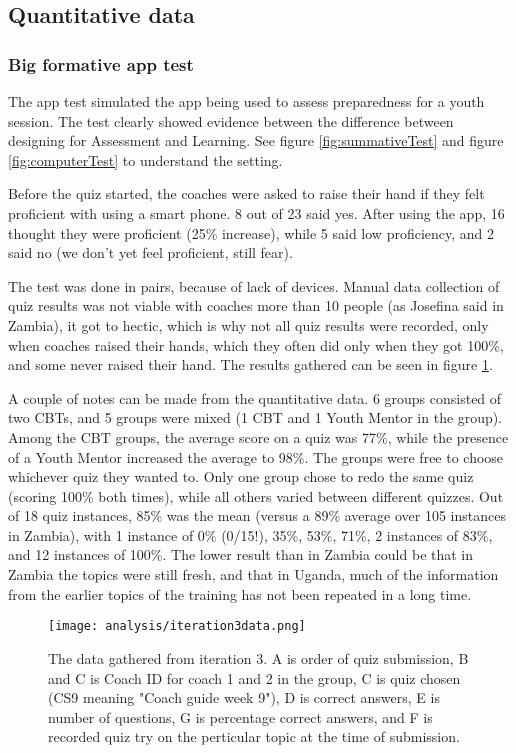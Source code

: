 \subsection{Quantitative data}


    \subsubsection{Big formative app test}
  The app test simulated the app being used to assess preparedness for a youth session. The test clearly showed evidence between the difference between designing for Assessment and Learning. See figure \ref{fig:summativeTest} and figure \ref{fig:computerTest} to understand the setting.

  Before the quiz started, the coaches were asked to raise their hand if they felt proficient with using a smart phone. 8 out of 23 said yes. After using the app, 16 thought they were proficient (25\% increase), while 5 said low proficiency, and 2 said no (we don't yet feel proficient, still fear).

  The test was done in pairs, because of lack of devices. Manual data collection of quiz results was not viable with coaches more than 10 people (as Josefina said in Zambia), it got to hectic, which is why not all quiz results were recorded, only when coaches raised their hands, which they often did only when they got 100\%, and some never raised their hand. The results gathered can be seen in figure \ref{fig:iteration3data}.

  A couple of notes can be made from the quantitative data. 6 groups consisted of two CBTs, and 5 groups were mixed (1 CBT and 1 Youth Mentor in the group). Among the CBT groups, the average score on a quiz was 77\%, while the presence of a Youth Mentor increased the average to 98\%. The groups were free to choose whichever quiz they wanted to. Only one group chose to redo the same quiz (scoring 100\% both times), while all others varied between different quizzes. Out of 18 quiz instances, 85\% was the mean (versus a 89\% average over 105 instances in Zambia), with 1 instance of 0\% (0/15!), 35\%, 53\%, 71\%, 2 instances of 83\%, and 12 instances of 100\%. The lower result than in Zambia could be that in Zambia the topics were still fresh, and that in Uganda, much of the information from the earlier topics of the training has not been repeated in a long time.

  \begin{figure}[h]
    \centering
    \texttt{[image: analysis/iteration3data.png]}
    \caption{The data gathered from iteration 3. A is order of quiz submission, B and C is Coach ID for coach 1 and 2 in the group, C is quiz chosen (CS9 meaning "Coach guide week 9"), D is correct answers, E is number of questions, G is percentage correct answers, and F is recorded quiz try on the perticular topic at the time of submission.}
    \label{fig:iteration3data}
  \end{figure}

